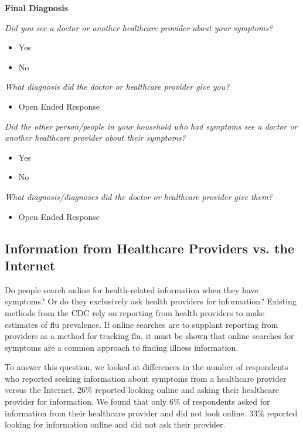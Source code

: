 \documentclass[12pt]{article}
\begin{document}
\textbf{Final Diagnosis}

\emph{Did you see a doctor or another healthcare provider about your symptoms?}
\begin{itemize}
\item Yes
\item No
\end{itemize}

\emph{What diagnosis did the doctor or healthcare provider give you?}
\begin{itemize}
\item Open Ended Response
\end{itemize}
 
\emph{Did the other person/people in your household who had symptoms see a doctor or another healthcare provider about their symptoms?}
\begin{itemize}
\item Yes
\item No
\end{itemize}

\emph{What diagnosis/diagnoses did the doctor or healthcare provider give them?}
\begin{itemize}
\item Open Ended Response
\end{itemize}




\subsection{Information from Healthcare Providers vs. the Internet}

Do people search online for health-related information when they have symptoms? Or do they exclusively ask health providers for information? Existing methods from the CDC rely on reporting from health providers to make estimates of flu prevalence. If online searches are to supplant reporting from providers as a method for tracking flu, it must be shown that online searches for symptoms are a common approach to finding illness information. 

To answer this question, we looked at differences in the number of respondents who reported seeking information about symptoms from a healthcare provider versus the Internet. 26\% reported looking online and asking their healthcare provider for information. We found that only 6\% of respondents asked for information from their healthcare provider and did not look online. 33\% reported looking for information online and did not ask their provider. 
\end{document}
